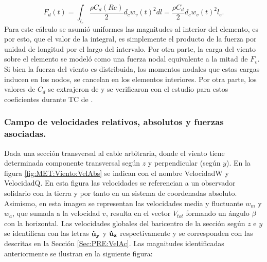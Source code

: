 \begin{equation}
	\label{Eq:MET:FuerzaViento}
	F_d(t)=\int_{l_e}\frac{\rho C_d(Re)}{2}{d_c w_v(t)^2} dl= \frac{\rho C_d}{2}d_c w_v(t)^2l_{e}.
\end{equation}
Para este cálculo se asumió uniformes las magnitudes al interior del elemento, es por esto, que el valor de la integral, es simplemente el producto de la fuerza por unidad de longitud por el largo del intervalo. Por otra parte, la carga del viento sobre el elemento se modeló como una fuerza nodal equivalente a la mitad de $F_v$. Si bien la fuerza del viento es distribuida, los momentos nodales que estas cargas inducen en los nodos, se cancelan en los elementos interiores. Por otra parte, los valores de $C_d$ se extrajeron de \cite{Foti2016} y se verificaron con el estudio para estos coeficientes durante TC de \cite{mara2007effects}. 

\subsubsection{Campo de velocidades relativos, absolutos y fuerzas asociadas.}\label{SubSec:MET:CampoVelRealt}
Dada una sección transversal al cable arbitraria, donde el viento tiene determinada componente transversal según $z$ y perpendicular (según $y$). En la figura \ref{fig:MET:Viento:VelAbs} se indican con el nombre \gls{VelocidadW} y \gls{VelocidadQ}. En esta figura las velocidades se referencian a un observador solidario con la tierra y por tanto en un sistema de coordenadas absoluto. Asimismo, en esta imagen se representan las velocidades media y fluctuante $w_m$ y $w_a$, que sumada a la velocidad $v$, resulta en el vector $V_{tot}$ formando un ángulo $\beta$ con la horizontal. Las velocidades globales del baricentro de la sección según $z$ e $y$ se identifican con las letras $\bf{\dot{u}}_{y}$ y $\bf{\dot{u}}_{z}$ respectivamente y se corresponden con las descritas en la Sección \ref{Sec:PRE:VelAc}. Las magnitudes identificadas anteriormente se ilustran en la siguiente figura:
% 

